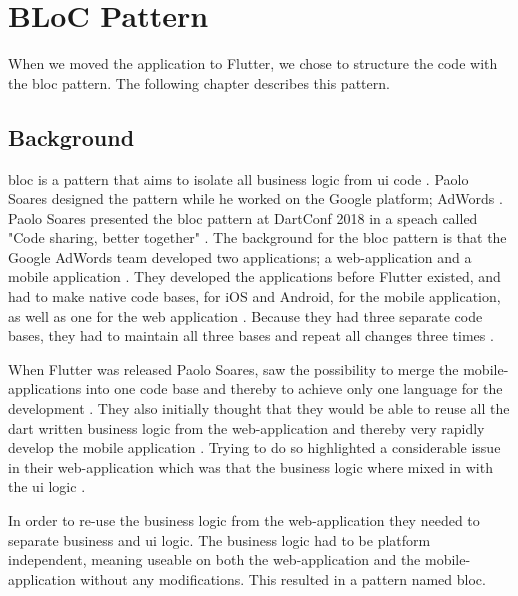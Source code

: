 \section{BLoC Pattern}
When we moved the application to Flutter, we chose to structure the code with the \gls{bloc} pattern. The following chapter describes this pattern.

\subsection{Background}
\gls{bloc} is a pattern that aims to isolate all business logic from \gls{ui} code \cite{blocPattern}. Paolo Soares designed the pattern while he worked on the Google platform; AdWords \cite[30 sec]{blocPattern}. Paolo Soares presented the \gls{bloc} pattern at DartConf 2018 in a speach called "Code sharing, better together" \cite{blocPattern}.
The background for the \gls{bloc} pattern is that the Google AdWords team  developed two applications; a web-application and a mobile application \cite[30 sec]{blocPattern}.
They developed the applications before Flutter existed, and had to make native code bases, for iOS and Android, for the mobile application, as well as one for the web application \cite[30 sec]{blocPattern}.
Because they had three separate code bases, they had to maintain all three bases and repeat all changes three times \cite[30 sec]{blocPattern}.

When Flutter was released Paolo Soares, saw the possibility to merge the mobile-applications into one code base and thereby to achieve only one language for the development \cite[1 min 15 sec]{blocPattern}. They also initially thought that they would be able to reuse all the dart written business logic from the web-application and thereby very rapidly develop the mobile application \cite[1 min 48 sec]{blocPattern}. Trying to do so highlighted a considerable issue in their web-application which was that the business logic where mixed in with the \gls{ui} logic \cite[2 min 12 sec]{blocPattern}.

In order to re-use the business logic from the web-application they needed to separate business and \gls{ui} logic. The business logic had to be platform independent, meaning useable on both the web-application and the mobile-application without any modifications\cite[2 min 12 sec]{blocPattern}. This resulted in a pattern named \gls{bloc}.

